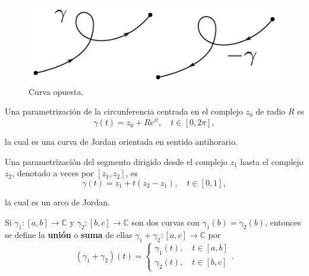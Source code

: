 \begin{defi}
\begin{enumerate}
\begin{figure}[H]
    \centering
    \includegraphics[scale = 0.5]{Figuras/Curva4.pdf}
    \caption{Curva opuesta.}
    \label{fig:Curva4}
\end{figure}

\end{enumerate}

\begin{ejemplo}
Una parametrización de la circunferencia centrada en el complejo $z_0$ de radio $R$ es
$$\gamma(t) = z_0 + R e^{it}, \quad t \in [0,2\pi],$$

la cual es una curva de Jordan orientada en sentido antihorario.
\end{ejemplo}

\begin{ejemplo}
Una parametrización del segmento dirigido desde el complejo $z_1$ hasta el complejo $z_2$, denotado a veces por $[z_1,z_2]$, es 
$$\gamma(t) = z_1 + t(z_2 - z_1), \quad t\in [0,1],$$

la cual es un arco de Jordan.
\end{ejemplo}

\end{defi}

\begin{defi}
 Si $\gamma_1: [a,b] \longrightarrow \mathbb{C}$ y $\gamma_2: [b,c] \longrightarrow \mathbb{C}$ son dos curvas con $\gamma_1(b) = \gamma_2(b)$, entonces se define la \textbf{unión} o \textbf{suma} de ellas $\gamma_1 + \gamma_2: [a,c] \longrightarrow \mathbb{C}$ por 
\begin{equation*}
(\gamma_1 + \gamma_2)(t) = \left\{ \begin{array}{c}
\gamma_1(t), \quad t \in [a,b] \\
\gamma_2(t), \quad t \in [b,c]
\end{array}  \right. .
\end{equation*}
\end{defi}

